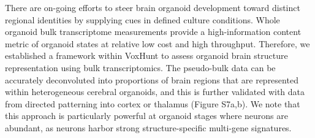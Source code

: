 There are on-going efforts to steer brain organoid development toward distinct regional identities by supplying cues in defined culture conditions. Whole organoid bulk transcriptome measurements provide a high-information content metric of organoid states at relative low cost and high throughput. Therefore, we established a framework within VoxHunt to assess organoid brain structure representation using bulk transcriptomics. The pseudo-bulk data can be accurately deconvoluted into proportions of brain regions that are represented within heterogeneous cerebral organoids, and this is further validated with data from directed patterning into cortex or thalamus (Figure S7a,b). We note that this approach is particularly powerful at organoid stages where neurons are abundant, as neurons harbor strong structure-specific multi-gene signatures.


